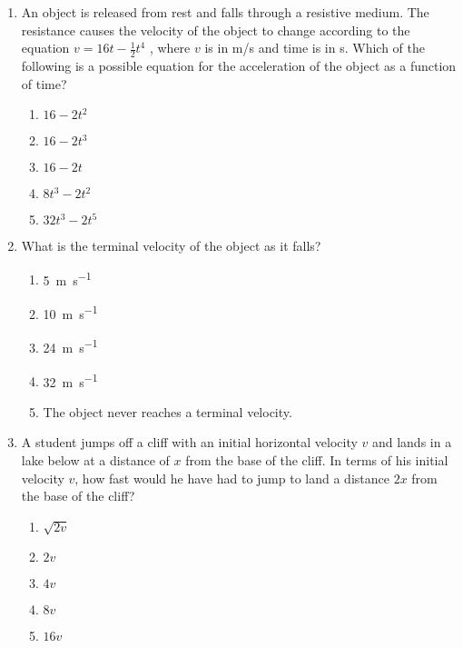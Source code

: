 \documentclass{../../../oss-classkick}
\begin{document}
\begin{multicols*}{2}
  \begin{enumerate}[resume,leftmargin=18pt]
  \item An object is released from rest and falls through a resistive medium.
    The resistance causes the velocity of the object to change according to the
    equation $v=16t-\frac{1}{2}t^4$ , where $v$ is in \si{m/s} and time is in
    \si{\second}. Which of the following is a possible equation for the
    acceleration of the object as a function of time?
    \begin{enumerate}[nosep,leftmargin=18pt,label=(\Alph*)]
    \item $16-2t^2$
    \item $16-2t^3$
    \item $16-2t$
    \item $8t^3-2t^2$
    \item $32t^3-2t^5$
    \end{enumerate}
    \label{q:fall1}
    
  \item What is the terminal velocity of the object as it falls?
    \begin{enumerate}[nosep,leftmargin=18pt,label=(\Alph*)]
    \item \SI{5 }{\metre\per\second}
    \item \SI{10}{\metre\per\second}
    \item \SI{24}{\metre\per\second}
    \item \SI{32}{\metre\per\second}
    \item The object never reaches a terminal velocity.
    \end{enumerate}
    \label{q:fall2}
    
  \item A student jumps off a cliff with an initial horizontal velocity $v$ and
    lands in a lake below at a distance of $x$ from the base of the cliff. In
    terms of his initial velocity $v$, how fast would he have had to jump to
    land a distance $2x$ from the base of the cliff?
    \begin{center}
    \end{center}
    \begin{enumerate}[nosep,leftmargin=18pt,label=(\Alph*)]
    \item $\sqrt{2v}$
    \item $2v$
    \item $4v$
    \item $8v$
    \item $16v$
    \end{enumerate}
    

\end{enumerate}
\end{multicols*}
\end{document}
